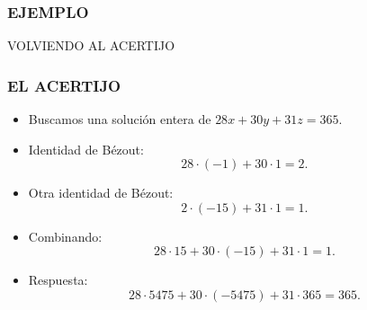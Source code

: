\begin{frame}
  \frametitle{EJEMPLO}




\end{frame}

\begin{frame}
  \vfill

  \begin{center}\huge\headingfont
    VOLVIENDO AL ACERTIJO
  \end{center}

  \vfill
\end{frame}

\begin{frame}
  \frametitle{EL ACERTIJO}

  \begin{itemize}
  \item<2-> Buscamos una solución entera de
    $28x + 30y + 31z = 365$.

  \item<3-> Identidad de Bézout:
    $$28\cdot (-1) + 30\cdot 1 = 2.$$

  \item<4-> Otra identidad de Bézout:
    $$2\cdot (-15) + 31\cdot 1 = 1.$$

  \item<5-> Combinando:
    $$28\cdot 15 + 30\cdot (-15) + 31\cdot 1 = 1.$$

  \item<6-> Respuesta:
    $$28\cdot 5475 + 30\cdot (-5475) + 31\cdot 365 = 365.$$
  \end{itemize}
\end{frame}

